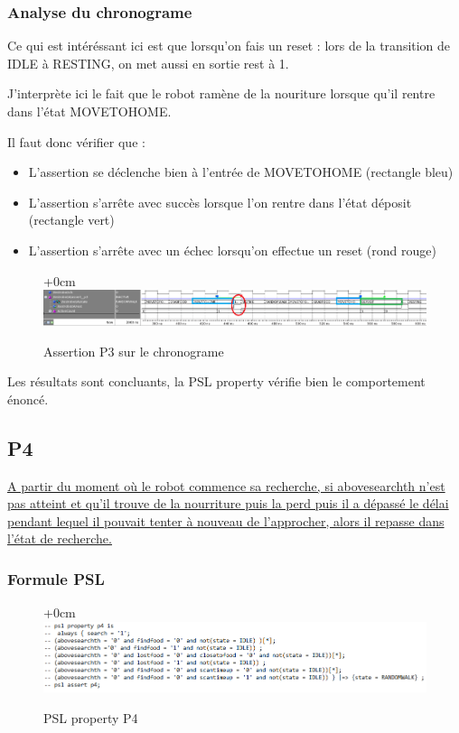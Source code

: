 \documentclass{article}
\begin{document}
\subsubsection{Analyse du chronograme}
Ce qui est intéréssant ici est que lorsqu'on fais un reset : lors de la transition de IDLE à RESTING, on met aussi en sortie rest à 1. 

J'interprète ici le fait que le robot ramène de la nouriture lorsque qu'il rentre dans l'état MOVETOHOME.

Il faut donc vérifier que :

\begin{itemize}
\item  L'assertion se déclenche bien à l'entrée de MOVETOHOME (rectangle bleu)
\item L'assertion s'arrête avec succès lorsque l'on rentre dans l'état déposit (rectangle vert)
\item L'assertion s'arrête avec un échec lorsqu'on effectue un reset (rond rouge)
\end{itemize} 


\begin{figure}[!h]
\advance\leftskip+0cm
\includegraphics[scale=0.6]{PSL/P3-1.PNG}
\caption{Assertion P3 sur le chronograme }
\end{figure}


Les résultats sont concluants, la PSL property vérifie bien le comportement énoncé.

\newpage

\subsection{P4}
\uline{A partir du moment où le robot commence sa recherche, si abovesearchth n'est pas
atteint et qu'il trouve de la nourriture puis la perd puis il a dépassé le délai pendant lequel
il pouvait tenter à nouveau de l'approcher, alors il repasse dans l'état de recherche.}
\subsubsection{Formule PSL }
\begin{figure}[!h]
\advance\leftskip+0cm
\includegraphics[scale=0.7]{PSL/P4.PNG}
\caption{PSL property P4}
\end{figure}
\end{document}
